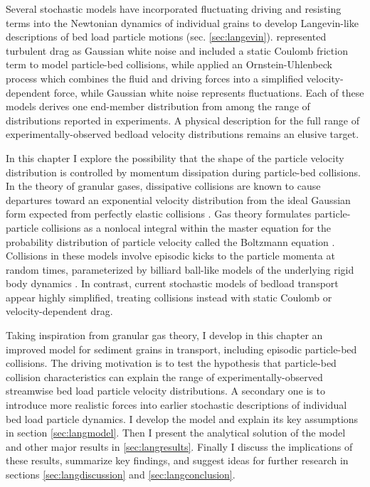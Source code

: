 Several stochastic models have incorporated fluctuating driving and resisting terms into the Newtonian dynamics of individual grains to develop Langevin-like descriptions of bed load particle motions (sec. \ref{sec:langevin}). \citet{Fan2014} represented turbulent drag as Gaussian white noise and included a static Coulomb friction term to model particle-bed collisions, while \citet{Ancey2014} applied an Ornstein-Uhlenbeck process which combines the fluid and driving forces into a simplified velocity-dependent force, while Gaussian white noise represents fluctuations.
Each of these models derives one end-member distribution from among the range of distributions reported in experiments.
A physical description for the full range of experimentally-observed bedload velocity distributions remains an elusive target.

In this chapter I explore the possibility that the shape of the particle velocity distribution is controlled by momentum dissipation during particle-bed collisions.
In the theory of granular gases, dissipative collisions are known to cause departures toward an exponential velocity distribution from the ideal Gaussian form expected from perfectly elastic collisions \citep{Brilliantov2004}.
Gas theory formulates particle-particle collisions as a nonlocal integral within the master equation for the probability distribution of particle velocity called the Boltzmann equation \citep{Landau1969,Chapman1970}.
Collisions in these models involve episodic kicks to the particle momenta at random times, parameterized by billiard ball-like models of the underlying rigid body dynamics \citep[e.g.][]{Brach1989}.
In contrast, current stochastic models of bedload transport appear highly simplified, treating collisions instead with static Coulomb or velocity-dependent drag.

Taking inspiration from granular gas theory, I develop in this chapter an improved model for sediment grains in transport, including episodic particle-bed collisions.
The driving motivation is to test the hypothesis that particle-bed collision characteristics can explain the range of experimentally-observed streamwise bed load particle velocity distributions.
A secondary one is to introduce more realistic forces into earlier stochastic descriptions of individual bed load particle dynamics. 
I develop the model and explain its key assumptions in section \ref{sec:langmodel}. Then I present the analytical solution of the model and other major results in \ref{sec:langresults}. Finally I discuss the implications of these results, summarize key findings, and suggest ideas for further research in sections \ref{sec:langdiscussion} and \ref{sec:langconclusion}.



